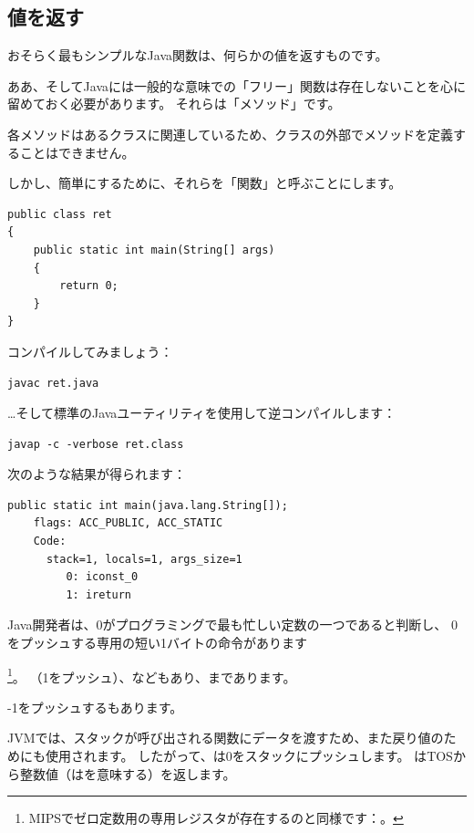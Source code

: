 \subsection{値を返す}

おそらく最もシンプルなJava関数は、何らかの値を返すものです。

ああ、そしてJavaには一般的な意味での「フリー」関数は存在しないことを心に留めておく必要があります。
それらは「メソッド」です。

各メソッドはあるクラスに関連しているため、クラスの外部でメソッドを定義することはできません。

しかし、簡単にするために、それらを「関数」と呼ぶことにします。

\begin{lstlisting}[style=customjava]
public class ret
{
	public static int main(String[] args) 
	{
		return 0;
	}
}
\end{lstlisting}

コンパイルしてみましょう：

\begin{lstlisting}
javac ret.java
\end{lstlisting}

\dots そして標準のJavaユーティリティを使用して逆コンパイルします：

\begin{lstlisting}
javap -c -verbose ret.class
\end{lstlisting}

次のような結果が得られます：

\begin{lstlisting}[caption=JDK 1.7 (抜粋)]
  public static int main(java.lang.String[]);
    flags: ACC_PUBLIC, ACC_STATIC
    Code:
      stack=1, locals=1, args_size=1
         0: iconst_0      
         1: ireturn       
\end{lstlisting}

Java開発者は、0がプログラミングで最も忙しい定数の一つであると判断し、
0をプッシュする専用の短い1バイトの命令があります

\footnote{MIPSでゼロ定数用の専用レジスタが存在するのと同様です：。}。
（1をプッシュ）、などもあり、まであります。

-1をプッシュするもあります。

JVMでは、スタックが呼び出される関数にデータを渡すため、また戻り値のためにも使用されます。
したがって、は0をスタックにプッシュします。
は\ac{TOS}から整数値（はを意味する）を返します。

